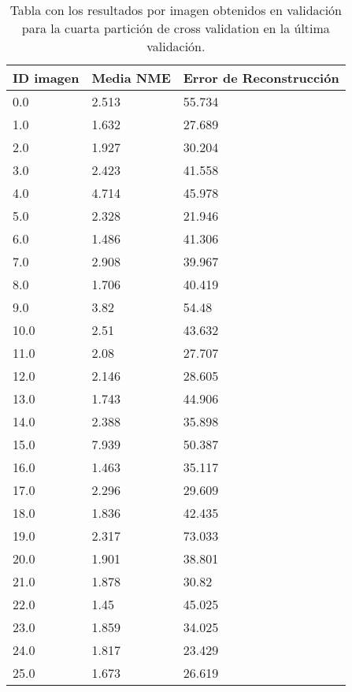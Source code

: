 \begin{table}[!ht]
    \centering
    \caption{Tabla con los resultados por imagen obtenidos en validación para la cuarta partición de cross validation en la última validación.}
    \begin{tabular}{|l|l|l|}
    \hline
        ID imagen & Media NME & Error de Reconstrucción \\ \hline
        0.0 & 2.513 & 55.734 \\ \hline
        1.0 & 1.632 & 27.689 \\ \hline
        2.0 & 1.927 & 30.204 \\ \hline
        3.0 & 2.423 & 41.558 \\ \hline
        4.0 & 4.714 & 45.978 \\ \hline
        5.0 & 2.328 & 21.946 \\ \hline
        6.0 & 1.486 & 41.306 \\ \hline
        7.0 & 2.908 & 39.967 \\ \hline
        8.0 & 1.706 & 40.419 \\ \hline
        9.0 & 3.82 & 54.48 \\ \hline
        10.0 & 2.51 & 43.632 \\ \hline
        11.0 & 2.08 & 27.707 \\ \hline
        12.0 & 2.146 & 28.605 \\ \hline
        13.0 & 1.743 & 44.906 \\ \hline
        14.0 & 2.388 & 35.898 \\ \hline
        15.0 & 7.939 & 50.387 \\ \hline
        16.0 & 1.463 & 35.117 \\ \hline
        17.0 & 2.296 & 29.609 \\ \hline
        18.0 & 1.836 & 42.435 \\ \hline
        19.0 & 2.317 & 73.033 \\ \hline
        20.0 & 1.901 & 38.801 \\ \hline
        21.0 & 1.878 & 30.82 \\ \hline
        22.0 & 1.45 & 45.025 \\ \hline
        23.0 & 1.859 & 34.025 \\ \hline
        24.0 & 1.817 & 23.429 \\ \hline
        25.0 & 1.673 & 26.619 \\ \hline
    \end{tabular}
    \label{table:Decoder_images_4}
\end{table}

